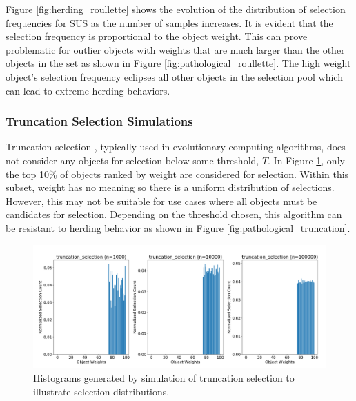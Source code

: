 \documentclass[12pt]{article}
\begin{document}
    Figure \ref{fig:herding_roullette} shows the evolution of the
    distribution of selection frequencies for SUS as the number of samples
    increases. It is evident that the selection frequency is proportional to the
    object weight. This can prove problematic for outlier objects with weights
    that are much larger than the other objects in the set as shown in Figure
    \ref{fig:pathological_roullette}. The high weight object's selection
    frequency eclipses all other objects in the selection pool which can lead
    to extreme herding behaviors.

    \subsubsection{Truncation Selection Simulations}
    Truncation selection \cite{truncation1973}, typically used in evolutionary
    computing algorithms, does not consider any objects for selection below
    some threshold, $T$. In Figure \ref{fig:herding_truncation}, only the top
    10\% of objects ranked by weight are considered for selection. Within this
    subset, weight has no meaning so there is a uniform distribution of
    selections. However, this may not be suitable for use cases where all
    objects must be candidates for selection.  Depending on the threshold
    chosen, this algorithm can be resistant to herding behavior as shown in
    Figure \ref{fig:pathological_truncation}. 

    \begin{figure}[htbp]
      \centering
      \includegraphics[scale=0.32]{images/herding_truncation.png} 
      \caption{Histograms generated by simulation of truncation selection
               to illustrate selection distributions.}
      \label{fig:herding_truncation}
    \end{figure}
\end{document}
